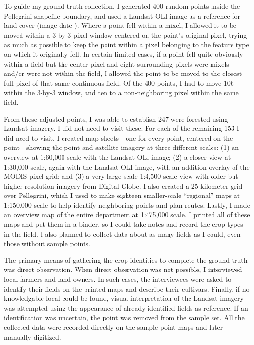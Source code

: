 To guide my ground truth collection, I generated 400 random points inside the Pellegrini shapefile boundary, and used a Landsat OLI image as a reference for land cover (image date ). Where a point fell within a mixel, I allowed it to be moved within a 3-by-3 pixel window centered on the point's original pixel, trying as much as possible to keep the point within a pixel belonging to the feature type on which it originally fell. In certain limited cases, if a point fell quite obviously within a field but the center pixel and eight surrounding pixels were mixels and/or were not within the field, I allowed the point to be moved to the closest full pixel of that same continuous field. Of the 400 points, I had to move 106 within the 3-by-3 window, and ten to a non-neighboring pixel within the same field.

From these adjusted points, I was able to establish 247 were forested using Landsat imagery. I did not need to visit these. For each of the remaining 153 I did need to visit, I created map sheets---one for every point, centered on the point---showing the point and satellite imagery at three different scales: (1) an overview at 1:60,000 scale with the  Landsat OLI image; (2) a closer view at 1:30,000 scale, again with the Landsat OLI image, with an addition overlay of the MODIS pixel grid; and (3) a very large scale 1:4,500 scale view with older but higher resolution imagery from Digital Globe. I also created a 25-kilometer grid over Pellegrini, which I used to make eighteen smaller-scale ``regional'' maps at 1:150,000 scale to help identify neighboring points and plan routes. Lastly, I made an overview map of the entire department at 1:475,000 scale. I printed all of these maps and put them in a binder, so I could take notes and record the crop types in the field. I also planned to collect data about as many fields as I could, even those without sample points.
 
The primary means of gathering the crop identities to complete the ground truth was direct observation. When direct observation was not possible, I interviewed local farmers and land owners. In such cases, the interviewees were asked to identify their fields on the printed maps and describe their cultivars. Finally, if no knowledgable local could be found, visual interpretation of the Landsat imagery was attempted using the appearance of already-identified fields as reference. If an identification was uncertain, the point was removed from the sample set. All the collected data were recorded directly on the sample point maps and later manually digitized.

